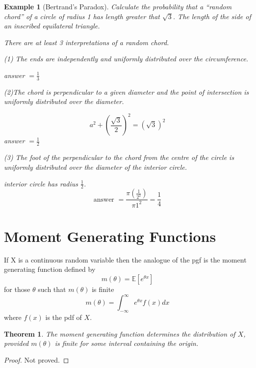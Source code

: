 \documentclass{notes}
\theoremstyle{plain}
\newtheorem{theorem}{Theorem}[chapter]
\newtheorem*{example}{Example}
\newcommand{\bE}{\mathbb{E}}
\newcommand{\expect}[1]{\bE\!\left[#1\right]}
\begin{document}
\begin{example}[Bertrand's Paradox]

Calculate the probability that a ``random chord'' of a circle of
radius 1 has length greater that $\sqrt{3}$. The length of the side of
an inscribed equilateral triangle.

There are at least 3 interpretations of a random chord.

(1) The ends are independently and uniformly distributed over the
    circumference.

\vspace{2in}

answer $=\frac{1}{3}$

(2)The chord is perpendicular to a given diameter and the point of
   intersection is uniformly distributed over the diameter.

\vspace{2in}

\[
a^2 +\left(\frac{\sqrt{3}}{2}\right)^2  = \left(\sqrt{3}\right)^2
\]
answer $= \frac{1}{2}$

(3) The foot of the perpendicular to the chord from the centre of the
    circle is uniformly distributed over the diameter of the
    interior circle.

\vspace{2in}

interior circle has radius $\frac{1}{2}$.
\[
\text{answer } = \frac{\pi\left(\frac{1}{2^2}\right)}{\pi 1^2} = \frac{1}{4}
\]
\end{example}
\section{Moment Generating Functions}

If X is a continuous random variable then the analogue of the pgf is
the moment generating function defined by
\[
m(\theta) = \expect{e^{\theta x}}
\]
for those $ \theta$ such that $m(\theta)$ is finite
\[
m(\theta) = \int_{-\infty}^{\infty} e^{\theta x}f(x)dx
\]
where $f(x)$ is the pdf of $X$.

\begin{theorem}
The moment generating function determines the distribution of $X$,
provided $m(\theta)$ is finite for some interval containing the origin.

\end{theorem}

\begin{proof}
Not proved.
\end{proof}
\end{document}
